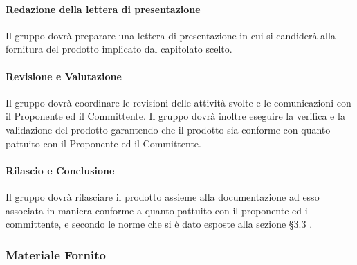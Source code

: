 			\paragraph{Redazione della lettera di presentazione}
				Il gruppo dovrà preparare una lettera di presentazione in cui si candiderà alla fornitura del prodotto implicato dal capitolato scelto.\\
			\paragraph{Revisione e Valutazione}
				Il gruppo dovrà coordinare le revisioni delle attività svolte e le comunicazioni con il Proponente ed il Committente. Il gruppo dovrà inoltre eseguire la verifica e la validazione del prodotto garantendo che il prodotto sia conforme con quanto pattuito con il Proponente ed il Committente.\\
			\paragraph{Rilascio e Conclusione}
				Il gruppo dovrà rilasciare il prodotto assieme alla documentazione ad esso associata in maniera conforme a quanto pattuito con il proponente ed il committente, e secondo le norme che si è dato esposte alla sezione §3.3 .\\
		
		\subsubsection{Materiale Fornito}
